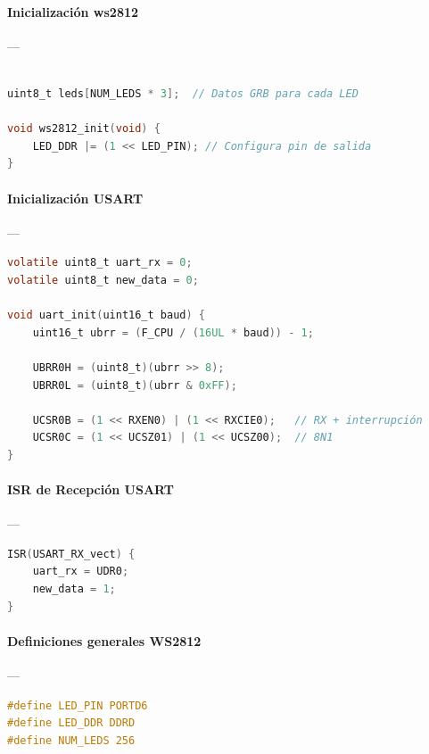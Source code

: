 \paragraph{Inicialización ws2812}\label{anexo:initWS}---\\
\begin{lstlisting}[language=C, caption={Inicializacion ws2812}]

uint8_t leds[NUM_LEDS * 3];  // Datos GRB para cada LED

void ws2812_init(void) {
	LED_DDR |= (1 << LED_PIN); // Configura pin de salida
}

\end{lstlisting}

\paragraph{Inicialización USART}\label{anexo:USARTinit}---\\
\begin{lstlisting}[language=C, caption={Inicializacion de USART para recepcion asincrona}]
volatile uint8_t uart_rx = 0;
volatile uint8_t new_data = 0;

void uart_init(uint16_t baud) {
    uint16_t ubrr = (F_CPU / (16UL * baud)) - 1;

    UBRR0H = (uint8_t)(ubrr >> 8);
    UBRR0L = (uint8_t)(ubrr & 0xFF);

    UCSR0B = (1 << RXEN0) | (1 << RXCIE0);   // RX + interrupción
    UCSR0C = (1 << UCSZ01) | (1 << UCSZ00);  // 8N1
}
\end{lstlisting}


\paragraph{ISR de Recepción USART}\label{anexo:USARTisr}---\\
\begin{lstlisting}[language=C, caption={Rutina de servicio de interrupcion USART RX}]
ISR(USART_RX_vect) {
    uart_rx = UDR0;
    new_data = 1;
}
\end{lstlisting}


\paragraph{Definiciones generales WS2812}\label{anexo:defWS}---\\
\begin{lstlisting}[language=C, caption={Definiciones del modulo WS2812}]
#define LED_PIN PORTD6
#define LED_DDR DDRD
#define NUM_LEDS 256


\end{lstlisting}


